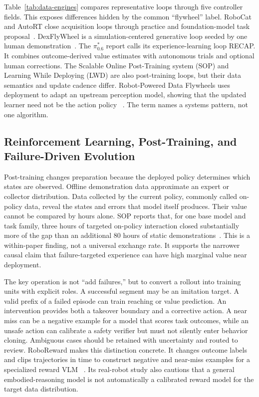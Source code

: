 Table~\ref{tab:data-engines} compares representative loops through five controller fields.
This exposes differences hidden by the common ``flywheel'' label.
RoboCat and AutoRT close acquisition loops through practice and foundation-model task proposal~\cite{bousmalis2023robocat_2306_11706,ahn2024autort_2401_12963}.
DexFlyWheel is a simulation-centered generative loop seeded by one human demonstration~\cite{zhu2025dexflywheel_2509_23829}.
The $\pi^{*}_{0.6}$ report calls its experience-learning loop RECAP.
It combines outcome-derived value estimates with autonomous trials and optional human corrections.
The Scalable Online Post-Training system (SOP) and Learning While Deploying (LWD) are also post-training loops, but their data semantics and update cadence differ.
Robot-Powered Data Flywheels uses deployment to adapt an upstream perception model, showing that the updated learner need not be the action policy ~\cite{grannen2025robot_2511_19647}.
The term names a systems pattern, not one algorithm.



\subsection{Reinforcement Learning, Post-Training, and Failure-Driven Evolution}

Post-training changes preparation because the deployed policy determines which states are observed.
Offline demonstration data approximate an expert or collector distribution.
Data collected by the current policy, commonly called on-policy data, reveal the states and errors that model itself produces.
Their value cannot be compared by hours alone.
SOP reports that, for one base model and task family, three hours of targeted on-policy interaction closed substantially more of the gap than an additional 80 hours of static demonstrations~\cite{pan2026sop_2601_03044}.
This is a within-paper finding, not a universal exchange rate.
It supports the narrower causal claim that failure-targeted experience can have high marginal value near deployment.

The key operation is not ``add failures,'' but to convert a rollout into training units with explicit roles.
A successful segment may be an imitation target.
A valid prefix of a failed episode can train reaching or value prediction.
An intervention provides both a takeover boundary and a corrective action.
A near miss can be a negative example for a model that scores task outcomes, while an unsafe action can calibrate a safety verifier but must not silently enter behavior cloning.
Ambiguous cases should be retained with uncertainty and routed to review.
RoboReward makes this distinction concrete.
It changes outcome labels and clips trajectories in time to construct negative and near-miss examples for a specialized reward VLM ~\cite{lee2026roboreward_2601_00675}.
Its real-robot study also cautions that a general embodied-reasoning model is not automatically a calibrated reward model for the target data distribution.

